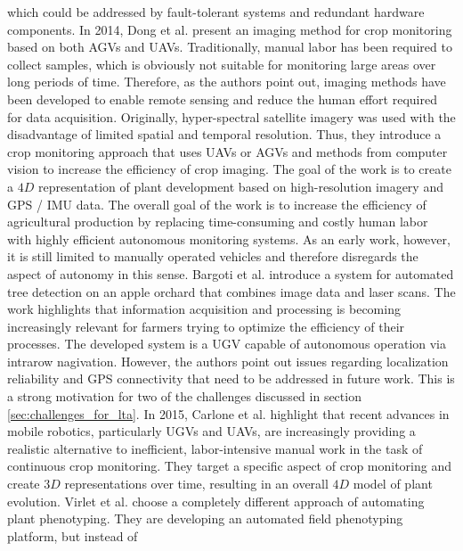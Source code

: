 \documentclass[english, master, utf8]{base/thesis_KBS}
\begin{document}
which could be addressed by fault-tolerant systems and redundant hardware components. \cite{Dunbabin:2012}\newline
In 2014, Dong et al. \cite{Dong:2014} present an imaging method for crop monitoring based on both AGVs and UAVs. Traditionally, manual labor has been required to collect samples, which is
obviously not suitable for monitoring large areas over long periods of time. \cite{Dong:2014} Therefore, as the authors point out, imaging methods have been developed to enable
remote sensing and reduce the human effort required for data acquisition. Originally, hyper-spectral satellite imagery was used with the disadvantage of limited spatial and temporal
resolution. \cite{Dong:2014} Thus, they introduce a crop monitoring approach that uses UAVs or AGVs and methods from computer vision to increase the efficiency of crop imaging.
The goal of the work is to create a $4D$ representation of plant development based on high-resolution imagery and GPS / IMU data. The overall goal of the work is to increase the
efficiency of agricultural production by replacing time-consuming and costly human labor with highly efficient autonomous monitoring systems.
As an early work, however, it is still limited to manually operated vehicles and therefore disregards the aspect of autonomy in this sense.\newline
Bargoti et al. \cite{Bargoti:2015} introduce a system for automated tree detection on an apple orchard that combines image data and laser scans. The work highlights that information
acquisition and processing is becoming increasingly relevant for farmers trying to optimize the efficiency of their processes. The developed system is a UGV capable of autonomous
operation via intrarow nagivation. However, the authors point out issues regarding localization reliability and GPS connectivity that need to be addressed in future work.
This is a strong motivation for two of the challenges discussed in section \ref{sec:challenges_for_lta}.\newline
In 2015, Carlone et al. \cite{Carlone:2015} highlight that recent advances in mobile robotics, particularly UGVs and UAVs, are increasingly providing a realistic alternative to
inefficient, labor-intensive manual work in the task of continuous crop monitoring. They target a specific aspect of crop monitoring and create $3D$ representations over time,
resulting in an overall $4D$ model of plant evolution. \newline
Virlet et al. \cite{Virlet:2016} choose a completely different approach of automating plant phenotyping. They are developing an automated field phenotyping platform, but instead of
\end{document}
